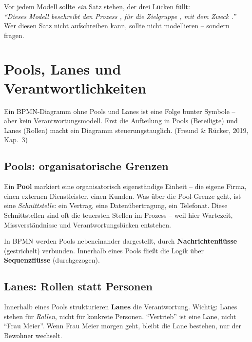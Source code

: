 \documentclass[11pt,a4paper,oneside]{article}
\newcommand{\fachbegriff}[1]{\textbf{#1}}
\newcommand{\quelle}[1]{{\footnotesize\color{lpGray}(#1)}}
\begin{document}
\begin{merkbox}
Vor jedem Modell sollte \emph{ein} Satz stehen, der drei Lücken füllt:\\[4pt]
\emph{``Dieses Modell beschreibt den Prozess \underline{\hspace{2.5cm}}, für die Zielgruppe \underline{\hspace{2.5cm}}, mit dem Zweck \underline{\hspace{2.5cm}}.''}\\[4pt]
Wer diesen Satz nicht aufschreiben kann, sollte nicht modellieren -- sondern fragen.
\end{merkbox}

\section{Pools, Lanes und Verantwortlichkeiten}

Ein BPMN-Diagramm ohne Pools und Lanes ist eine Folge bunter Symbole -- aber kein Verantwortungsmodell. Erst die Aufteilung in Pools (Beteiligte) und Lanes (Rollen) macht ein Diagramm steuerungstauglich. \quelle{Freund \& Rücker, 2019, Kap.~3}

\subsection{Pools: organisatorische Grenzen}

Ein \fachbegriff{Pool} markiert eine organisatorisch eigenständige Einheit -- die eigene Firma, einen externen Dienstleister, einen Kunden. Was über die Pool-Grenze geht, ist eine \emph{Schnittstelle}: ein Vertrag, eine Datenübertragung, ein Telefonat. Diese Schnittstellen sind oft die teuersten Stellen im Prozess -- weil hier Wartezeit, Missverständnisse und Verantwortungslücken entstehen.

In BPMN werden Pools nebeneinander dargestellt, durch \fachbegriff{Nachrichtenflüsse} (gestrichelt) verbunden. Innerhalb eines Pools fließt die Logik über \fachbegriff{Sequenzflüsse} (durchgezogen).

\subsection{Lanes: Rollen statt Personen}

Innerhalb eines Pools strukturieren \fachbegriff{Lanes} die Verantwortung. Wichtig: Lanes stehen für \emph{Rollen}, nicht für konkrete Personen. ``Vertrieb'' ist eine Lane, nicht ``Frau Meier''. Wenn Frau Meier morgen geht, bleibt die Lane bestehen, nur der Bewohner wechselt.
\end{document}
